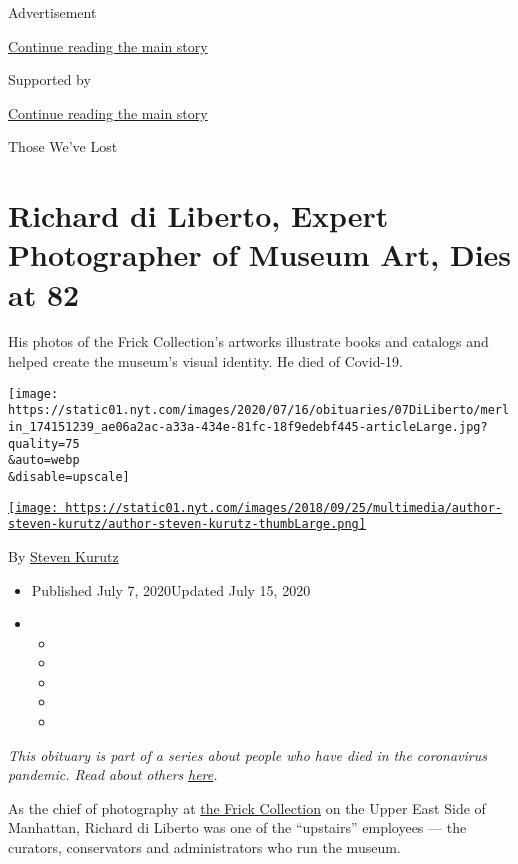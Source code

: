 Advertisement

\protect\hyperlink{after-top}{Continue reading the main story}

Supported by

\protect\hyperlink{after-sponsor}{Continue reading the main story}

Those We've Lost

\hypertarget{richard-di-liberto-expert-photographer-of-museum-art-dies-at-82}{%
\section{Richard di Liberto, Expert Photographer of Museum Art, Dies at
82}\label{richard-di-liberto-expert-photographer-of-museum-art-dies-at-82}}

His photos of the Frick Collection's artworks illustrate books and
catalogs and helped create the museum's visual identity. He died of
Covid-19.

\texttt{[image: https://static01.nyt.com/images/2020/07/16/obituaries/07DiLiberto/merlin\_174151239\_ae06a2ac-a33a-434e-81fc-18f9edebf445-articleLarge.jpg?quality=75\\\&auto=webp\\\&disable=upscale]}

\href{https://www.nytimes.com/by/steven-kurutz}{\texttt{[image: https://static01.nyt.com/images/2018/09/25/multimedia/author-steven-kurutz/author-steven-kurutz-thumbLarge.png]}}

By \href{https://www.nytimes.com/by/steven-kurutz}{Steven Kurutz}

\begin{itemize}
\item
  Published July 7, 2020Updated July 15, 2020
\item
  \begin{itemize}
  \item
  \item
  \item
  \item
  \item
  \end{itemize}
\end{itemize}

\emph{This obituary is part of a series about people who have died in
the coronavirus pandemic. Read about others}
\href{https://www.nytimes.com/interactive/2020/obituaries/people-died-coronavirus-obituaries.html}{\emph{here}}\emph{.}

As the chief of photography at \href{https://www.frick.org/}{the Frick
Collection} on the Upper East Side of Manhattan, Richard di Liberto was
one of the ``upstairs'' employees --- the curators, conservators and
administrators who run the museum.

